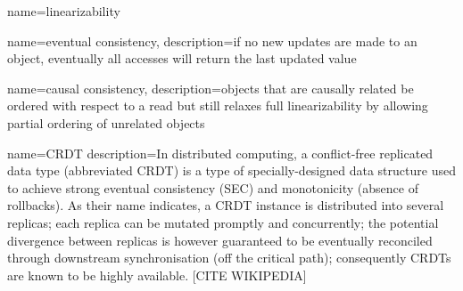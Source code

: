 %
%
%
%

{
    name=linearizability
}

{
    name={eventual consistency},
    description={if no new updates are made to an object, eventually all accesses will return the last updated value}
}

{
    name={causal consistency},
    description={objects that are causally related be ordered with respect to a read but still relaxes full linearizability by allowing partial ordering of unrelated objects}
}

{
  name={CRDT}
  description={In distributed computing, a conflict-free replicated data type (abbreviated CRDT) is a type of specially-designed data structure used to achieve strong eventual consistency (SEC) and monotonicity (absence of rollbacks). As their name indicates, a CRDT instance is distributed into several replicas; each replica can be mutated promptly and concurrently; the potential divergence between replicas is however guaranteed to be eventually reconciled through downstream synchronisation (off the critical path); consequently CRDTs are known to be highly available. [CITE WIKIPEDIA]\cite{crdt_wikipedia} }
}
